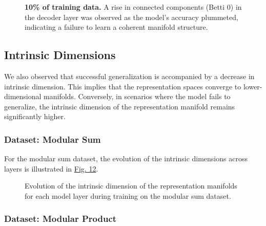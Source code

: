 \begin{figure}[htbp]
    \centering
    
    
    \caption[10\% of training data (Modular Product).]{\textbf{10\% of training data.} A rise in connected components (Betti 0) in the decoder layer was observed as the model's accuracy plummeted, indicating a failure to learn a coherent manifold structure.}
    \label{fig:prod-decoder0-linear-10pct}
\end{figure}

\newpage

\subsection{Intrinsic Dimensions}

We also observed that successful generalization is accompanied by a decrease in intrinsic dimension. This implies that the representation spaces converge to lower-dimensional manifolds. Conversely, in scenarios where the model fails to generalize, the intrinsic dimension of the representation manifold remains significantly higher.

\subsubsection{Dataset: Modular Sum}

For the modular sum dataset, the evolution of the intrinsic dimensions across layers is illustrated in \hyperref[fig:IntrinsicDimensionEvolutionSum]{Fig. 12}.

\begin{figure}[H]
    \centering
     
     
     
    \caption[Intrinsic dimension evolution (Modular Sum).]{Evolution of the intrinsic dimension of the representation manifolds for each model layer during training on the modular sum dataset.}
    \label{fig:IntrinsicDimensionEvolutionSum}
\end{figure}

\subsubsection{Dataset: Modular Product}

